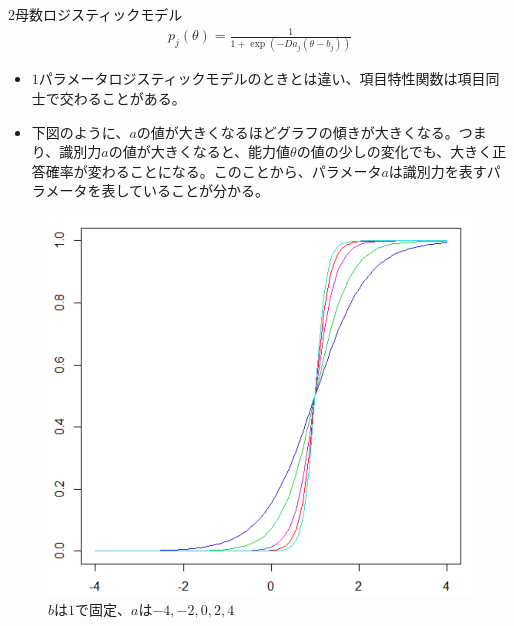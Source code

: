 \documentclass[aspectratio=169, dvipdfmx, 12pt]{beamer}
\begin{document}
\begin{frame}
  \begin{block}{$2$母数ロジスティックモデル}
  \begin{align}
    \displaystyle
    p_j(\theta) = \frac{1}{1+\exp(-Da_j(\theta - b_j))}
  \end{align}
  \begin{itemize}
    \item $1$パラメータロジスティックモデルのときとは違い、項目特性関数は項目同士で交わることがある。
    \item 下図のように、$a$の値が大きくなるほどグラフの傾きが大きくなる。つまり、識別力$a$の値が大きくなると、能力値$\theta$の値の少しの変化でも、大きく正答確率が変わることになる。このことから、パラメータ$a$は識別力を表すパラメータを表していることが分かる。
  \end{itemize}
\end{block}
\end{frame}
\begin{frame}
  \begin{figure}[H]
    \centering
    \includegraphics[bb = 650 470 1 1,scale = 0.25]{A.png}
    \vspace{4cm}
    \caption{$b$は$1$で固定、$a$は$-4, -2, 0, 2, 4$}
  \end{figure}
\end{frame}
\end{document}
